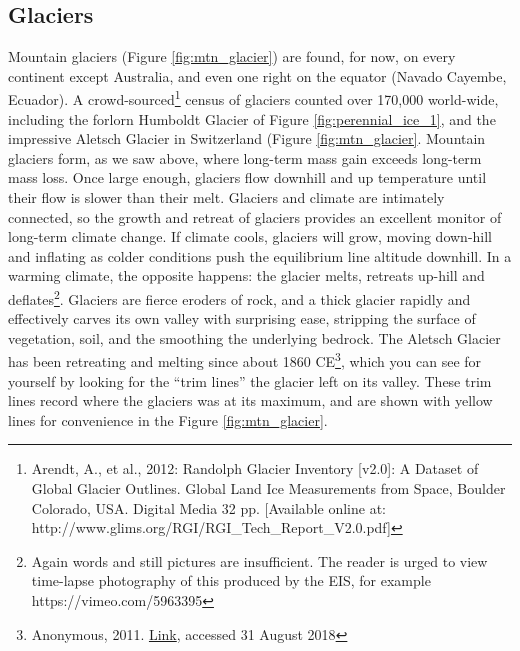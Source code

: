 \documentclass[amstex,12pt]{book}
\begin{document}
\subsection{Glaciers}
Mountain glaciers (Figure \ref{fig:mtn_glacier}) are found, for now, on every continent except Australia,  and even one right on the equator (Navado Cayembe, Ecuador). A crowd-sourced\footnote{Arendt, A., et al., 2012: Randolph Glacier Inventory [v2.0]: A Dataset of Global Glacier Outlines. Global Land Ice Measurements from Space, Boulder Colorado, USA. Digital Media 32 pp. [Available online at: http://www.glims.org/RGI/RGI\_Tech\_Report\_V2.0.pdf]} census of glaciers counted over 170,000 world-wide, including the forlorn Humboldt Glacier of Figure \ref{fig:perennial_ice_1}, and the impressive Aletsch Glacier in Switzerland (Figure \ref{fig:mtn_glacier}. Mountain glaciers form, as we saw above, where long-term mass gain exceeds long-term mass loss. Once large enough, glaciers flow downhill and up temperature until their flow is slower than their melt. Glaciers and climate are intimately connected, so the growth and retreat of glaciers provides an excellent monitor of long-term climate change. If climate cools, glaciers will grow, moving down-hill and inflating as colder conditions push the equilibrium line altitude downhill. In a warming climate, the opposite happens: the glacier melts, retreats up-hill and deflates\footnote{Again words and still pictures are insufficient. The reader is urged to view time-lapse photography of this produced by the EIS, for example https://vimeo.com/5963395}. Glaciers are fierce eroders of rock, and a thick glacier rapidly and effectively carves its own valley with surprising ease, stripping the surface of vegetation, soil, and the smoothing the underlying bedrock. The Aletsch Glacier has been retreating and melting since about 1860 CE\footnote{Anonymous, 2011. \href{http://archive.sciencewatch.com/dr/erf/2011/11feberf/11feberfHolz/}{Link}, accessed 31 August 2018}, which you can see for yourself by looking for the ``trim lines'' the glacier left on its valley. These trim lines record where the glaciers was at its maximum, and are shown with yellow lines for convenience in the Figure \ref{fig:mtn_glacier}. \\
\end{document}
